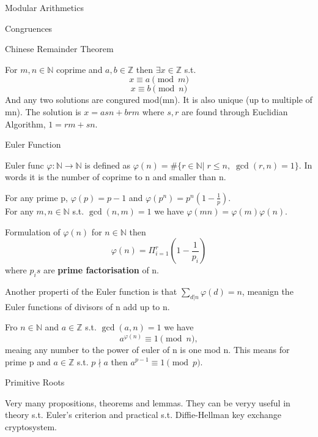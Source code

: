 \documentclass[12pt, letterpaper]{article}
\begin{document}
\begin{section}{Modular Arithmetics}
\begin{subsection}{Congruences}
    \begin{subsubsection}{Chinese Remainder Theorem}

      For \(m, n \in \mathbb{N}\) coprime and \(a, b \in \mathbb{Z}\) then
      \(\exists x \in \mathbb{Z}\) s.t. \[x \equiv a \pmod{m}\] \[x \equiv b \pmod{n}\]
      And any two solutions are congured mod(mn). It is also unique (up to multiple of mn).
      The solution is \(x = asn + brm\) where \(s, r\) are found through Euclidian
      Algorithm, \(1 = rm + sn\).

    \end{subsubsection}

  \end{subsection}

  \begin{subsection}{Euler Function}

    Euler func \(\varphi: \mathbb{N} \to \mathbb{N}\) is defined as
    \(\varphi(n) = \#\{ r \in \mathbb{N} | \; r \leq n, \; \gcd(r, n) = 1 \}\).
    In words it is the number of coprime to n and smaller than n.

    For any prime p, \(\varphi(p) = p - 1\) and \(\varphi(p^{n}) = p^{n}(1 - \frac{1}{p})\). \\
    For any \(m, n \in \mathbb{N}\) s.t. \(\gcd(n, m) = 1\) we have
    \(\varphi(mn) = \varphi(m) \varphi(n)\).

    Formulation of \(\varphi(n)\) for \(n \in \mathbb{N}\) then
    \[\varphi(n) = \Pi^{r}_{i = 1}(1 - \frac{1}{p_{i}})\] where
    \(p_{i}s\) are \textbf{prime factorisation} of n.

    Another properti of the Euler function is that \(\sum_{d | n} \varphi(d) = n\),
    meanign the Euler functions of divisors of n add up to n.

    Fro \(n \in \mathbb{N}\) and \(a \in \mathbb{Z}\) s.t. \(\gcd(a, n) = 1\) we
    have \[a^{\varphi(n)} \equiv 1 \pmod{n},\] meaing any number to the power of
    euler of n is one mod n.
    This means for prime p and \(a \in \mathbb{Z}\) s.t. \(p \nmid a\) then
    \(a^{p - 1} \equiv 1 \pmod{p}\).

  \end{subsection}

  \begin{subsection}{Primitive Roots}

    Very many propositions, theorems and lemmas. They can be veryy useful in
    theory s.t. Euler's criterion and practical s.t. Diffie-Hellman key exchange
    cryptosystem.


\end{subsection}
\end{section}
\end{document}
